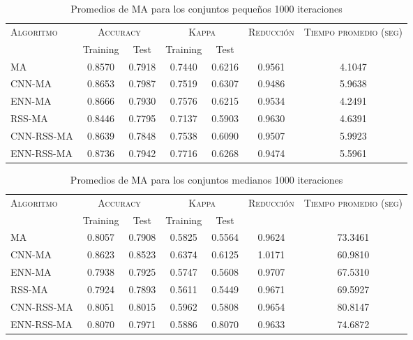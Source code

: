 \begin{table}[]
\centering
\begin{tabular}{l c c c c c c}
\hline
\multirow{2}{*}{\textsc{Algoritmo}}
	& \multicolumn{2}{c}{\textsc{Accuracy}}
	& \multicolumn{2}{c}{\textsc{Kappa}}
	& \textsc{Reducción}
	& \textsc{Tiempo promedio (seg)} \\
	& Training & Test
	& Training & Test \\ 
\hline
\hline

MA   & 0.8570 & 0.7918 & 0.7440 & 0.6216 & 0.9561 & 4.1047 \\
CNN-MA & 0.8653 & 0.7987 & 0.7519 & 0.6307 & 0.9486 & 5.9638 \\
ENN-MA & 0.8666 & 0.7930 & 0.7576 & 0.6215 & 0.9534 & 4.2491 \\
RSS-MA & 0.8446 & 0.7795 & 0.7137 & 0.5903 & 0.9630 & 4.6391 \\
CNN-RSS-MA  & 0.8639 & 0.7848 & 0.7538 & 0.6090 & 0.9507 & 5.9923 \\
ENN-RSS-MA & 0.8736 & 0.7942 & 0.7716 & 0.6268 & 0.9474 & 5.5961 \\

\hline
\end{tabular}
\caption{Promedios de MA para los conjuntos pequeños 1000 iteraciones}
\label{peq-ma}
\end{table}


\begin{table}[]
\centering
\begin{tabular}{l c c c c c c}
\hline
\multirow{2}{*}{\textsc{Algoritmo}}
	& \multicolumn{2}{c}{\textsc{Accuracy}}
	& \multicolumn{2}{c}{\textsc{Kappa}}
	& \textsc{Reducción}
	& \textsc{Tiempo promedio (seg)} \\
	& Training & Test
	& Training & Test \\ 
\hline
\hline

MA   & 0.8057 & 0.7908 & 0.5825 & 0.5564 & 0.9624 & 73.3461 \\
CNN-MA & 0.8623 & 0.8523 & 0.6374 & 0.6125 & 1.0171 & 60.9810 \\
ENN-MA & 0.7938 & 0.7925 & 0.5747 & 0.5608 & 0.9707 & 67.5310 \\
RSS-MA & 0.7924 & 0.7893 & 0.5611 & 0.5449 & 0.9671 & 69.5927 \\
CNN-RSS-MA & 0.8051 & 0.8015 & 0.5962 & 0.5808 & 0.9654 & 80.8147 \\
ENN-RSS-MA & 0.8070 & 0.7971 & 0.5886 & 0.8070 & 0.9633 & 74.6872 \\

\hline
\end{tabular}
\caption{Promedios de MA para los conjuntos medianos 1000 iteraciones}
\label{med-ma}
\end{table}

